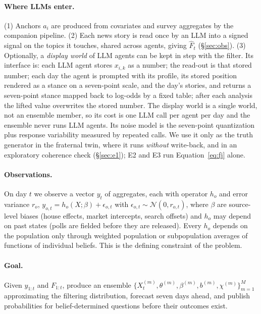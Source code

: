 \documentclass[10pt]{article}
\theoremstyle{remark}
\begin{document}
\paragraph{Where LLMs enter.} (1) Anchors $a_i$ are produced from covariates and survey aggregates by the companion pipeline. (2) Each news story is read once by an LLM into a signed signal on the topics it touches, shared across agents, giving $\hat F_t$ (\S\ref{sec:obs}). (3) Optionally, a \emph{display world} of LLM agents can be kept in step with the filter. Its interface is: each LLM agent stores $x_{i,k}$ as a number; the read-out is that stored number; each day the agent is prompted with its profile, its stored position rendered as a stance on a seven-point scale, and the day's stories, and returns a seven-point stance mapped back to log-odds by a fixed table; after each analysis the lifted value overwrites the stored number. The display world is a single world, not an ensemble member, so its cost is one LLM call per agent per day and the ensemble never runs LLM agents. Its noise model is the seven-point quantization plus response variability measured by repeated calls. We use it only as the truth generator in the fraternal twin, where it runs \emph{without} write-back, and in an exploratory coherence check (\S\ref{sec:e1}); E2 and E3 run Equation~\eqref{eq:fj} alone.

\paragraph{Observations.} On day $t$ we observe a vector $y_t$ of aggregates, each with operator $h_o$ and error variance $r_o$, $y_{o,t} = h_o(X;\beta) + \epsilon_{o,t}$ with $\epsilon_{o,t}\sim\mathcal{N}(0,r_{o,t})$, where $\beta$ are source-level biases (house effects, market intercepts, search offsets) and $h_o$ may depend on past states (polls are fielded before they are released). Every $h_o$ depends on the population only through weighted population or subpopulation averages of functions of individual beliefs. This is the defining constraint of the problem.

\paragraph{Goal.} Given $y_{1:t}$ and $F_{1:t}$, produce an ensemble $\{X_t^{(m)},\theta^{(m)},\beta^{(m)},b^{(m)},\chi^{(m)}\}_{m=1}^M$ approximating the filtering distribution, forecast seven days ahead, and publish probabilities for belief-determined questions before their outcomes exist.
\end{document}
